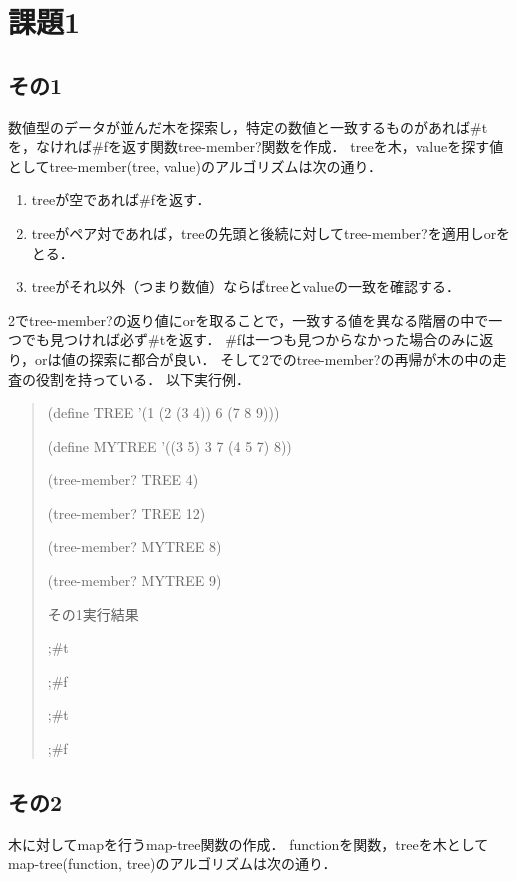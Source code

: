 \section{課題1}

\subsection{その1}
数値型のデータが並んだ木を探索し，特定の数値と一致するものがあれば\#tを，なければ\#fを返す関数tree-member?関数を作成．
treeを木，valueを探す値としてtree-member(tree, value)のアルゴリズムは次の通り．

\begin{enumerate}
\item treeが空であれば\#fを返す．
\item treeがペア対であれば，treeの先頭と後続に対してtree-member?を適用しorをとる．
\item treeがそれ以外（つまり数値）ならばtreeとvalueの一致を確認する．
\end{enumerate}

2でtree-member?の返り値にorを取ることで，一致する値を異なる階層の中で一つでも見つければ必ず\#tを返す．
\#fは一つも見つからなかった場合のみに返り，orは値の探索に都合が良い．
そして2でのtree-member?の再帰が木の中の走査の役割を持っている．
以下実行例．

\begin{quote}

  (define TREE '(1 (2 (3 4)) 6 (7 8 9)))
  
  (define MYTREE '((3 5) 3 7 (4 5 7) 8))
  
  
  (tree-member? TREE 4)
  
  (tree-member? TREE 12)
  
  (tree-member? MYTREE 8)
  
  (tree-member? MYTREE 9)
  
  その1実行結果
  
  ;\#t
  
  ;\#f
  
  ;\#t
  
  ;\#f
  
\end{quote}


\subsection{その2}
木に対してmapを行うmap-tree関数の作成．
functionを関数，treeを木としてmap-tree(function, tree)のアルゴリズムは次の通り．

